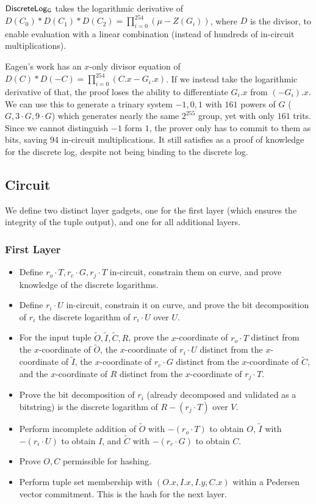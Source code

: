 \documentclass[]{article}
\begin{document}
$\mathsf{DiscreteLog_{G}}$ takes the logarithmic derivative of $D(C_0) * D(C_1) * D(C_2) = \prod_{i=0}^{254}(\mu - Z(G_i))$, where $D$ is the divisor, to enable evaluation with a linear combination (instead of hundreds of in-circuit multiplications).

Eagen's work has an $x$-only divisor equation of $D(C) * D(-C) = \prod_{i=0}^{254}(C.x - G_i.x)$. If we instead take the logarithmic derivative of that, the proof loses the ability to differentiate $G_i.x$ from $(-G_i).x$. We can use this to generate a trinary system $-1, 0, 1$ with $161$ powers of $G$ ($G, 3 \cdot G, 9 \cdot G$) which generates nearly the same $2^{255}$ group, yet with only $161$ trits. Since we cannot distinguish $-1$ form $1$, the prover only has to commit to them as bits, saving 94 in-circuit multiplications. It still satisfies as a proof of knowledge for the discrete log, despite not being binding to the discrete log.

\newpage

\subsection{Circuit}

We define two distinct layer gadgets, one for the first layer (which ensures the integrity of the tuple output), and one for all additional layers.

\subsubsection{First Layer}

\begin{itemize}
	\item Define $r_o \cdot T, r_c \cdot G, r_j \cdot T$ in-circuit, constrain them on curve, and prove knowledge of the discrete logarithms.
	\item Define $r_i \cdot U$ in-circuit, constrain it on curve, and prove the bit decomposition of $r_i$ the discrete logarithm of $r_i \cdot U$ over $U$.
	\item For the input tuple $\tilde{O}, \tilde{I}, \tilde{C}, R$, prove the $x$-coordinate of $r_o \cdot T$ distinct from the $x$-coordinate of $\tilde{O}$, the $x$-coordinate of $r_i \cdot U$ distinct from the $x$-coordinate of $\tilde{I}$, the $x$-coordinate of $r_c \cdot G$ distinct from the $x$-coordinate of $\tilde{C}$, and the $x$-coordinate of $R$ distinct from the $x$-coordinate of $r_j \cdot T$.
	\item Prove the bit decomposition of $r_i$ (already decomposed and validated as a bitstring) is the discrete logarithm of $R - (r_j \cdot T)$ over $V$.
	\item Perform incomplete addition of $\tilde{O}$ with $-(r_o \cdot T)$ to obtain $O$, $\tilde{I}$ with $-(r_i \cdot U)$ to obtain $I$, and $\tilde{C}$ with $-(r_c \cdot G)$ to obtain $C$.
	\item Prove $O, C$ permissible for hashing.
	\item Perform tuple set membership with $(O.x, I.x, I.y, C.x)$ within a Pedersen vector commitment. This is the hash for the next layer.
\end{itemize}
\end{document}
